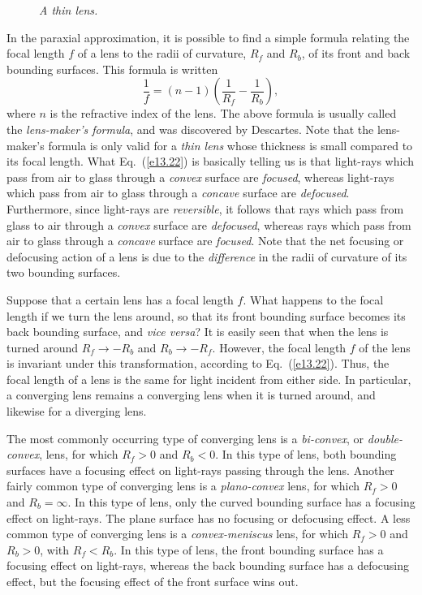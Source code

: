 \begin{figure}
\epsfysize=2.5in
\centerline{}
\caption{\em A thin lens.}\label{f13.11}
\end{figure}

In the paraxial approximation, it is possible to find a simple
formula relating 
 the focal length $f$  of a lens to the
radii of curvature, $R_f$ and $R_b$, of its front and back bounding surfaces.
This formula is written
\begin{equation}\label{e13.22}
\frac{1}{f} = (n-1)\left(\frac{1}{R_f} - \frac{1}{R_b}\right),
\end{equation}
where $n$ is the refractive index of the lens. The above formula
is usually  called the {\em lens-maker's formula}, and was discovered by
Descartes. Note that the lens-maker's formula is only valid for a
{\em thin lens}\/ whose thickness is small compared to its focal length.
What Eq.~(\ref{e13.22}) is basically
telling us is that light-rays
which pass from air to glass through a {\em convex}\/ surface are {\em focused}, whereas light-rays which pass from air to glass through a {\em concave}
surface are {\em defocused}. Furthermore, since light-rays are
{\em reversible}, it follows that rays which pass from  glass to air
through a {\em convex} surface are {\em defocused}, whereas rays
 which pass from air to glass through a {\em concave}\/
surface are {\em focused}. Note that the net focusing or defocusing action
of a lens is due to the {\em difference}\/ in the radii of curvature of
its two bounding surfaces. 

Suppose that a certain lens has a focal length $f$. What happens
to the focal length if we turn the lens around, so that its front
bounding surface becomes its back bounding surface, and {\em vice
versa}? It is easily seen that when the lens is turned around
$R_f\rightarrow -R_b$ and $R_b \rightarrow -R_f$. However, the focal
length $f$ of the lens is invariant under this transformation, according
to Eq.~(\ref{e13.22}). Thus, the focal length of a lens is the same for
light incident from either side. In particular, a converging
lens remains a converging lens when it is turned around, and likewise
for a diverging lens. 

The most commonly occurring type of converging lens is a {\em bi-convex},
or {\em double-convex}, lens, for which $R_f>0$ and $R_b<0$. In this
type of lens, both bounding surfaces have a focusing effect on light-rays
passing through the lens. Another fairly common type of
converging lens is a {\em plano-convex}\/ lens, for which
$R_f>0$ and $R_b=\infty$. In this type of
lens, only the curved bounding surface has a focusing effect on light-rays. The plane surface has no focusing or defocusing effect. 
A less common type of converging lens is a {\em convex-meniscus}\/
lens, for which $R_f>0$ and $R_b>0$, with $R_f<R_b$. In this type
of lens, the front bounding surface has a focusing effect on light-rays,
whereas the back bounding surface has a defocusing effect, but the
focusing effect of the front surface wins out. 


